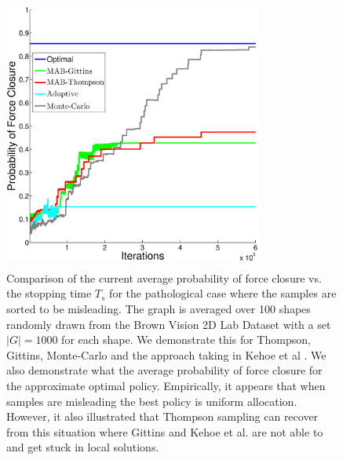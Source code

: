 \documentclass[journal,transmag]{IEEEtran}%
\begin{document}
\begin{figure}[ht!]
\centering
\includegraphics[width = 8.5cm, height = 9cm]{matlab_figures/worst_case.eps}
\caption{ \footnotesize Comparison of the current average probability of force closure vs. the stopping time $T_s$ for the pathological case where the samples are sorted to be misleading. The graph is averaged over 100 shapes randomly drawn from the Brown Vision 2D Lab Dataset \cite{brown} with a set $|G|=1000$ for each shape.  We demonstrate this for Thompson, Gittins, Monte-Carlo and the approach taking in Kehoe et al \cite{kehoe2012toward}. We also demonstrate what the average probability of force closure for the approximate optimal policy. Empirically, it appears that when samples are misleading the best policy is uniform allocation. However, it also illustrated that Thompson sampling can recover from this situation where Gittins and Kehoe et al.  are not able to and get stuck in local solutions. }
\vspace*{-10pt}
\label{fig:worst_case}
\end{figure}
\end{document}
